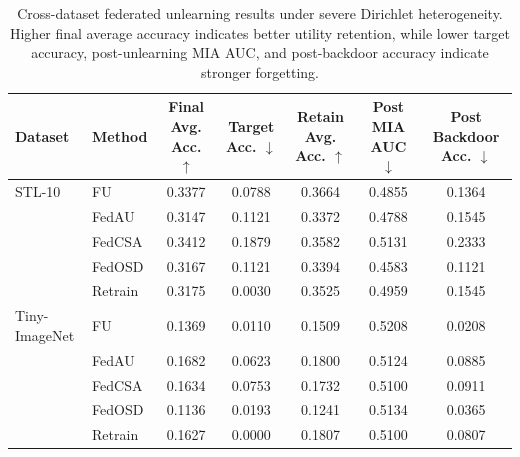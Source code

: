 \begin{table}[t]
\centering
\caption{Cross-dataset federated unlearning results under severe Dirichlet heterogeneity. Higher final average accuracy indicates better utility retention, while lower target accuracy, post-unlearning MIA AUC, and post-backdoor accuracy indicate stronger forgetting.}
\label{tab:cross_dataset_results}
\begin{tabular}{llccccc}
\toprule
Dataset & Method & Final Avg. Acc. $\uparrow$ & Target Acc. $\downarrow$ & Retain Avg. Acc. $\uparrow$ & Post MIA AUC $\downarrow$ & Post Backdoor Acc. $\downarrow$ \\
\midrule
STL-10 & FU & 0.3377 & 0.0788 & 0.3664 & 0.4855 & 0.1364 \\
 & FedAU & 0.3147 & 0.1121 & 0.3372 & 0.4788 & 0.1545 \\
 & FedCSA & 0.3412 & 0.1879 & 0.3582 & 0.5131 & 0.2333 \\
 & FedOSD & 0.3167 & 0.1121 & 0.3394 & 0.4583 & 0.1121 \\
 & Retrain & 0.3175 & 0.0030 & 0.3525 & 0.4959 & 0.1545 \\
\midrule
Tiny-ImageNet & FU & 0.1369 & 0.0110 & 0.1509 & 0.5208 & 0.0208 \\
 & FedAU & 0.1682 & 0.0623 & 0.1800 & 0.5124 & 0.0885 \\
 & FedCSA & 0.1634 & 0.0753 & 0.1732 & 0.5100 & 0.0911 \\
 & FedOSD & 0.1136 & 0.0193 & 0.1241 & 0.5134 & 0.0365 \\
 & Retrain & 0.1627 & 0.0000 & 0.1807 & 0.5100 & 0.0807 \\
\bottomrule
\end{tabular}
\end{table}